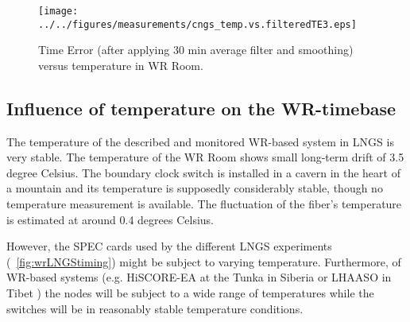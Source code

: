 \begin{figure}[!t]
\centering
\texttt{[image: ../../figures/measurements/cngs\_temp.vs.filteredTE3.eps]}
\caption{Time Error (after applying 30 min average filter and smoothing) versus temperature in WR Room.}
\label{fig:temp.vs.filteredTE}
\end{figure}



\subsection{Influence of temperature on the WR-timebase}

The temperature of the described and monitored WR-based system in LNGS is very stable. 
The temperature of the WR Room
shows small long-term drift of 3.5 degree Celsius. The boundary clock switch 
is installed in a cavern in the heart of a mountain and its temperature is supposedly considerably 
stable, though no temperature measurement is available. The fluctuation of the fiber's temperature 
is estimated at around 0.4 degrees Celsius. 

However, the SPEC cards used by the different LNGS experiments 
(\figurename~\ref{fig:wrLNGStiming}) might be subject to varying temperature. 
Furthermore,  of WR-based systems (e.g. HiSCORE-EA at the Tunka 
in Siberia \cite{biblio:tunka} or LHAASO in Tibet \cite{biblio:LHAASO}) the nodes will be subject 
to a wide range of temperatures while the switches will be in reasonably stable
temperature conditions.

